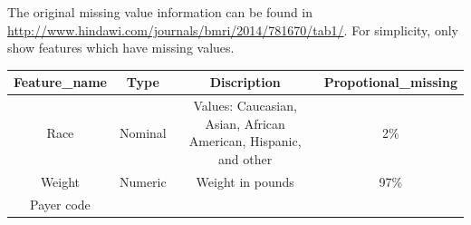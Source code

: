 \documentclass[]{article}
\begin{document}
The original missing value information can be found in
\url{http://www.hindawi.com/journals/bmri/2014/781670/tab1/}. For
simplicity, only show features which have missing values.

\begin{longtable}[c]{@{}cccc@{}}
\toprule
\begin{minipage}[b]{0.20\columnwidth}\centering\strut
Feature\_name
\strut\end{minipage} &
\begin{minipage}[b]{0.09\columnwidth}\centering\strut
Type
\strut\end{minipage} &
\begin{minipage}[b]{0.35\columnwidth}\centering\strut
Discription
\strut\end{minipage} &
\begin{minipage}[b]{0.24\columnwidth}\centering\strut
Propotional\_missing
\strut\end{minipage}\tabularnewline
\midrule
\endhead
\begin{minipage}[t]{0.20\columnwidth}\centering\strut
Race
\strut\end{minipage} &
\begin{minipage}[t]{0.09\columnwidth}\centering\strut
Nominal
\strut\end{minipage} &
\begin{minipage}[t]{0.35\columnwidth}\centering\strut
Values: Caucasian, Asian, African American, Hispanic, and other
\strut\end{minipage} &
\begin{minipage}[t]{0.24\columnwidth}\centering\strut
2\%
\strut\end{minipage}\tabularnewline
\begin{minipage}[t]{0.20\columnwidth}\centering\strut
Weight
\strut\end{minipage} &
\begin{minipage}[t]{0.09\columnwidth}\centering\strut
Numeric
\strut\end{minipage} &
\begin{minipage}[t]{0.35\columnwidth}\centering\strut
Weight in pounds
\strut\end{minipage} &
\begin{minipage}[t]{0.24\columnwidth}\centering\strut
97\%
\strut\end{minipage}\tabularnewline
\begin{minipage}[t]{0.20\columnwidth}\centering\strut
Payer code
\strut\end{minipage} &
\begin{minipage}[t]{0.09\columnwidth}\centering\strut

\end{minipage}
\end{longtable}
\end{document}
